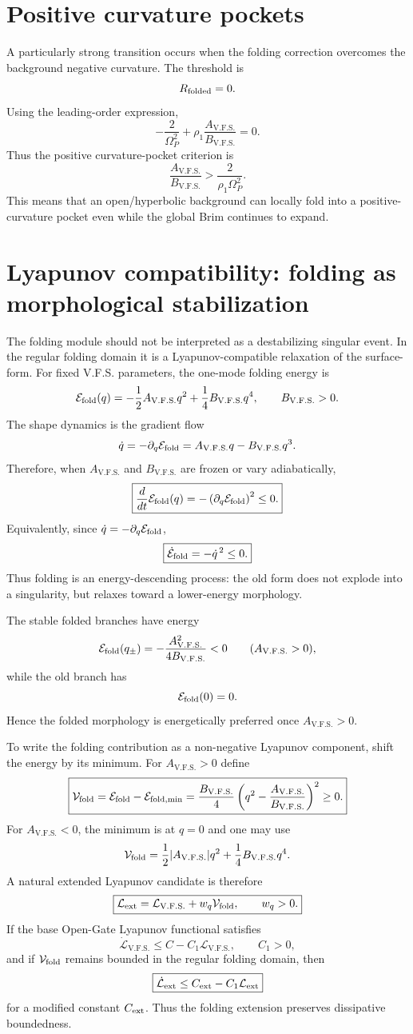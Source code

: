 \documentclass[11pt,a4paper]{article}
\newcommand{\VFS}{\ensuremath{\mathrm{V.F.S.}}}
\newcommand{\Op}{\Omega_P}
\theoremstyle{plain}
\theoremstyle{remark}
\theoremstyle{definition}
\begin{document}
\section{Positive curvature pockets}
A particularly strong transition occurs when the folding correction overcomes the background negative
curvature. The threshold is
\[
R_{\rm folded}=0.
\]
Using the leading-order expression,
\[
-\frac{2}{\Op^2}+\rho_1\frac{A_{\VFS}}{B_{\VFS}}=0.
\]
Thus the positive curvature-pocket criterion is
\[
\boxed{
\frac{A_{\VFS}}{B_{\VFS}}>\frac{2}{\rho_1\Op^2}.
}
\]
This means that an open/hyperbolic background can locally fold into a positive-curvature pocket even
while the global Brim continues to expand.


\section{Lyapunov compatibility: folding as morphological stabilization}
The folding module should not be interpreted as a destabilizing singular event. In the regular
folding domain it is a Lyapunov-compatible relaxation of the surface-form. For fixed V.F.S.
parameters, the one-mode folding energy is
\[
\mathcal E_{\rm fold}(q)
=
-\frac12A_{\VFS}q^2+
\frac14B_{\VFS}q^4,
\qquad B_{\VFS}>0.
\]
The shape dynamics is the gradient flow
\[
\dot q=-\partial_q\mathcal E_{\rm fold}
=A_{\VFS}q-B_{\VFS}q^3.
\]
Therefore, when $A_{\VFS}$ and $B_{\VFS}$ are frozen or vary adiabatically,
\[
\boxed{
\frac{d}{dt}\mathcal E_{\rm fold}(q)
=
-\left(\partial_q\mathcal E_{\rm fold}\right)^2
\le 0.
}
\]
Equivalently, since $\dot q=-\partial_q\mathcal E_{\rm fold}$,
\[
\boxed{
\dot{\mathcal E}_{\rm fold}=-\dot q^{\,2}\le0.
}
\]
Thus folding is an energy-descending process: the old form does not explode into a singularity, but
relaxes toward a lower-energy morphology.

The stable folded branches have energy
\[
\mathcal E_{\rm fold}(q_\pm)
=-\frac{A_{\VFS}^2}{4B_{\VFS}}<0
\qquad (A_{\VFS}>0),
\]
while the old branch has
\[
\mathcal E_{\rm fold}(0)=0.
\]
Hence the folded morphology is energetically preferred once $A_{\VFS}>0$.

To write the folding contribution as a non-negative Lyapunov component, shift the energy by its
minimum. For $A_{\VFS}>0$ define
\[
\boxed{
\mathcal V_{\rm fold}
=
\mathcal E_{\rm fold}-\mathcal E_{{\rm fold},\min}
=
\frac{B_{\VFS}}{4}
\left(q^2-\frac{A_{\VFS}}{B_{\VFS}}\right)^2
\ge0.
}
\]
For $A_{\VFS}<0$, the minimum is at $q=0$ and one may use
\[
\mathcal V_{\rm fold}
=
\frac12|A_{\VFS}|q^2+
\frac14B_{\VFS}q^4.
\]
A natural extended Lyapunov candidate is therefore
\[
\boxed{
\mathcal L_{\rm ext}
=
\mathcal L_{\VFS}+w_q\mathcal V_{\rm fold},
\qquad w_q>0.
}
\]
If the base Open-Gate Lyapunov functional satisfies
\[
\dot{\mathcal L}_{\VFS}\le C-C_1\mathcal L_{\VFS},
\qquad C_1>0,
\]
and if $\mathcal V_{\rm fold}$ remains bounded in the regular folding domain, then
\[
\boxed{
\dot{\mathcal L}_{\rm ext}
\le
C_{\rm ext}-C_1\mathcal L_{\rm ext}
}
\]
for a modified constant $C_{\rm ext}$. Thus the folding extension preserves dissipative boundedness.
\end{document}
